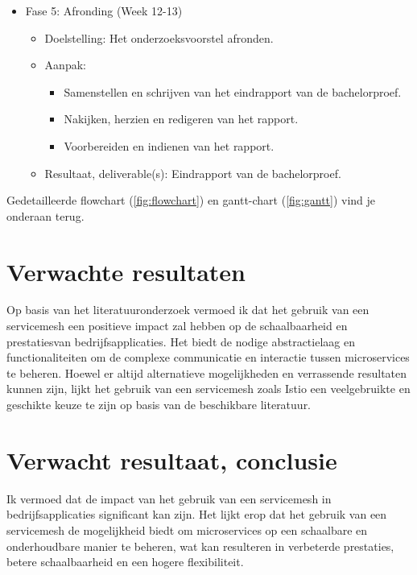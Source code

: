 \begin{itemize}
\begin{itemize}
    \end{itemize}   
    \item Fase 5: Afronding (Week 12-13)
    \begin{itemize} 
        \item Doelstelling: Het onderzoeksvoorstel afronden.
        \item Aanpak:
        \begin{itemize} 
            \item Samenstellen en schrijven van het eindrapport van de bachelorproef.
            \item Nakijken, herzien en redigeren van het rapport.
            \item Voorbereiden en indienen van het rapport.
        \end{itemize}     
        \item Resultaat, deliverable(s): Eindrapport van de bachelorproef.  
    \end{itemize}
\end{itemize}

Gedetailleerde flowchart (\ref{fig:flowchart}) en gantt-chart (\ref{fig:gantt}) vind je onderaan terug.


\section{Verwachte resultaten}%
\label{sec:verwachte-resultaten}

Op basis van het literatuuronderzoek vermoed ik dat het gebruik van een servicemesh een positieve impact zal hebben op de schaalbaarheid en prestatiesvan bedrijfsapplicaties. Het biedt de nodige abstractielaag en functionaliteiten om de complexe communicatie en interactie tussen microservices te beheren. Hoewel er altijd alternatieve mogelijkheden en verrassende resultaten kunnen zijn, lijkt het gebruik van een servicemesh zoals Istio een veelgebruikte en geschikte keuze te zijn op basis van de beschikbare literatuur.

\section{Verwacht resultaat, conclusie}%
\label{sec:verwachte_resultaten}

Ik vermoed dat de impact van het gebruik van een servicemesh in bedrijfsapplicaties significant kan zijn. Het lijkt erop dat het gebruik van een servicemesh de mogelijkheid biedt om microservices op een schaalbare en onderhoudbare manier te beheren, wat kan resulteren in verbeterde prestaties, betere schaalbaarheid en een hogere flexibiliteit.


